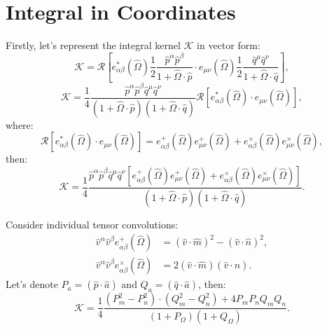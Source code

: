 \section{Integral in Coordinates}

Firstly, let's represent the integral kernel $\mathcal{K}$ in vector form:
\begin{equation*}
\mathcal{K}= \mathcal{R}\left[ e^{*}_{\alpha \beta}(\hat{\Omega}) \frac{1}{2} \frac{\hat{p}^{\alpha} \hat{p}^{\beta}}{1 + \hat{\Omega} \cdot \hat{p}} \cdot e_{\mu \nu}(\hat{\Omega}) \frac{1}{2} \frac{\hat{q}^{\mu} \hat{q}^{\nu}}{1 + \hat{\Omega} \cdot \hat{q}}
\right],
\end{equation*}
\begin{equation*}
\mathcal{K}= \frac{1}{4} \frac{\hat{p}^{\alpha} \hat{p}^{\beta}\hat{q}^{\mu} \hat{q}^{\nu}}{(1 + \hat{\Omega} \cdot \hat{p})(1 + \hat{\Omega} \cdot \hat{q})} \mathcal{R}\left[e^{*}_{\alpha \beta}(\hat{\Omega}) \cdot  e_{\mu \nu}(\hat{\Omega})\right],
\end{equation*}
where:
\begin{equation*}
\mathcal{R}\left[e^{*}_{\alpha \beta}(\hat{\Omega}) \cdot  e_{\mu \nu}(\hat{\Omega})\right] = e^{+}_{\alpha \beta}(\hat{\Omega})e^{+}_{\mu \nu}(\hat{\Omega}) + e^{\times}_{\alpha \beta}(\hat{\Omega})e^{\times}_{\mu \nu}(\hat{\Omega}),
\end{equation*}
then:
\begin{equation}
\mathcal{K} = \frac{1}{4} \frac{\hat{p}^{\alpha} \hat{p}^{\beta}\hat{q}^{\mu} \hat{q}^{\nu} \left[ e^{+}_{\alpha \beta}(\hat{\Omega})e^{+}_{\mu \nu}(\hat{\Omega}) + e^{\times}_{\alpha \beta}(\hat{\Omega})e^{\times}_{\mu \nu}(\hat{\Omega}) \right]}{(1 + \hat{\Omega} \cdot \hat{p})(1 + \hat{\Omega} \cdot \hat{q})}.
\end{equation}

Consider individual tensor convolutions:
\begin{subequations}
\begin{align}
\hat{v}^{\alpha} \hat{v}^{\beta} e^{+}_{\alpha \beta}(\hat{\Omega}) &= (\hat{v} \cdot \hat{m})^2 - (\hat{v} \cdot \hat{n})^2, \\
\hat{v}^{\alpha} \hat{v}^{\beta} e^{\times}_{\alpha \beta}(\hat{\Omega}) &= 2 (\hat{v} \cdot \hat{m})(\hat{v} \cdot \hat{n}).
\end{align}
\end{subequations}
Let's denote $P_{a} = (\hat{p} \cdot \hat{a})$ and $Q_{a} = (\hat{q} \cdot \hat{a})$, then:
\begin{equation}
\mathcal{K} = \frac{1}{4} \frac{(P_m^2 - P_n^2)\cdot(Q_m^2 - Q_n^2) + 4 P_m P_n Q_m Q_n}{(1 + P_{\Omega})(1 + Q_{\Omega})}.
\end{equation}

